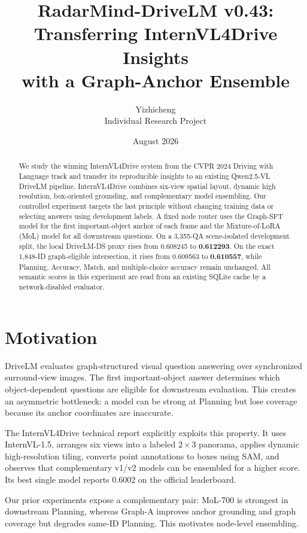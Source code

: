 \documentclass[10pt,twocolumn]{article}
\title{RadarMind-DriveLM v0.43: Transferring InternVL4Drive Insights\\with a Graph-Anchor Ensemble}
\author{Yizhicheng\\Individual Research Project}
\date{August 2026}
\begin{document}
\maketitle

\begin{abstract}
We study the winning InternVL4Drive system from the CVPR 2024 Driving with
Language track and transfer its reproducible insights to an existing
Qwen2.5-VL DriveLM pipeline. InternVL4Drive combines six-view spatial layout,
dynamic high resolution, box-oriented grounding, and complementary model
ensembling. Our controlled experiment targets the last principle without
changing training data or selecting answers using development labels. A fixed
node router uses the Graph-SFT model for the first important-object anchor of
each frame and the Mixture-of-LoRA (MoL) model for all downstream questions.
On a 3,355-QA scene-isolated development split, the local DriveLM-DS proxy rises
from 0.608245 to \textbf{0.612293}. On the exact 1,848-ID graph-eligible
intersection, it rises from 0.609563 to \textbf{0.610557}, while Planning,
Accuracy, Match, and multiple-choice accuracy remain unchanged. All semantic
scores in this experiment are read from an existing SQLite cache by a
network-disabled evaluator.
\end{abstract}

\section{Motivation}
DriveLM evaluates graph-structured visual question answering over synchronized
surround-view images. The first important-object answer determines which
object-dependent questions are eligible for downstream evaluation. This creates
an asymmetric bottleneck: a model can be strong at Planning but lose coverage
because its anchor coordinates are inaccurate.

The InternVL4Drive technical report explicitly exploits this property. It uses
InternVL-1.5, arranges six views into a labeled $2\times3$ panorama, applies
dynamic high-resolution tiling, converts point annotations to boxes using SAM,
and observes that complementary v1/v2 models can be ensembled for a higher
score. Its best single model reports 0.6002 on the official leaderboard.

Our prior experiments expose a complementary pair: MoL-700 is strongest in
downstream Planning, whereas Graph-A improves anchor grounding and graph
coverage but degrades same-ID Planning. This motivates node-level ensembling.
\end{document}
